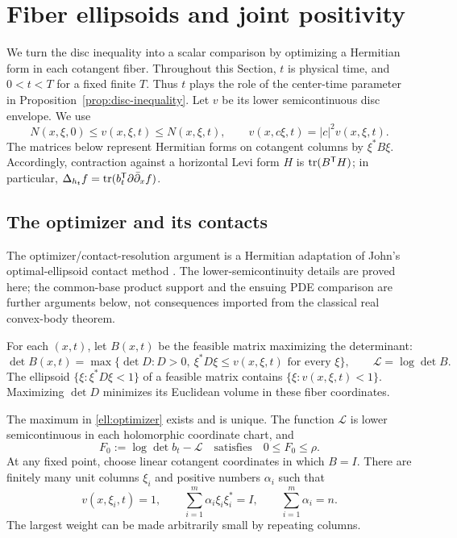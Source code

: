 \section{Fiber ellipsoids and joint positivity}\label{sec:ellipsoids}

We turn the disc inequality into a scalar comparison by optimizing a
Hermitian form in each cotangent fiber.  Throughout this Section, $t$ is
physical time, and $0<t<T$ for a fixed finite $T$.  Thus $t$ plays the
role of the center-time parameter in Proposition~\ref{prop:disc-inequality}.
Let $v$ be its lower semicontinuous disc envelope.  We use
\begin{equation}\label{ell:envelope-bounds}
 N(x,\xi,0)\le v(x,\xi,t)\le N(x,\xi,t),
 \qquad v(x,c\xi,t)=|c|^2v(x,\xi,t).
\end{equation}
The matrices below represent Hermitian forms on cotangent columns by
$\xi^*B\xi$.  Accordingly, contraction against a horizontal Levi form
$H$ is $\operatorname{tr}(B^{\mathsf T}H)$; in particular,
$\Delta_{h_t}f=\operatorname{tr}(b_t^{\mathsf T}\partial\bar\partial_xf)$.

\subsection{The optimizer and its contacts}

The optimizer/contact-resolution argument is a Hermitian adaptation of
John's optimal-ellipsoid contact method \cite{John1948}. The
lower-semicontinuity details are proved here; the common-base product
support and the ensuing PDE comparison are further arguments below,
not consequences imported from the classical real convex-body theorem.

For each $(x,t)$, let $B(x,t)$ be the feasible matrix maximizing the
determinant:
\begin{equation}\label{ell:optimizer}
 \det B(x,t)=\max\bigl\{\det D:
 D>0,\ \xi^*D\xi\le v(x,\xi,t)\text{ for every }\xi\bigr\},
 \qquad \mathcal L=\log\det B.
\end{equation}
The ellipsoid $\{\xi:\xi^*D\xi<1\}$ of a feasible matrix contains
$\{\xi:v(x,\xi,t)<1\}$.  Maximizing $\det D$ minimizes its Euclidean
volume in these fiber coordinates.

\begin{lemma}\label{ell:optimizer-contacts}
The maximum in \eqref{ell:optimizer} exists and is unique.
The function $\mathcal L$ is lower semicontinuous in each holomorphic
coordinate chart, and
\begin{equation}\label{ell:volume-gap}
 F_0:=\log\det b_t-\mathcal L
 \quad\text{satisfies}\quad 0\le F_0\le\rho.
\end{equation}
At any fixed point, choose linear cotangent coordinates in which $B=I$.
There are finitely many unit columns $\xi_i$ and positive numbers
$\alpha_i$ such that
\begin{equation}\label{ell:contact-resolution}
 v(x,\xi_i,t)=1,\qquad
 \sum_{i=1}^m\alpha_i\xi_i\xi_i^*=I,
 \qquad \sum_{i=1}^m\alpha_i=n.
\end{equation}
The largest weight can be made arbitrarily small by repeating columns.
\end{lemma}

